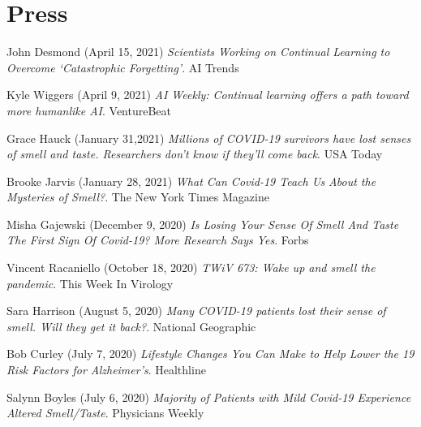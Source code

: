 \documentclass[10pt]{cooperCV2}
\begin{document}

\section{Press}

 
\begin{etaremune}[itemindent=-1.5\bibhang, topsep=0pt,
				   itemsep=\bibsep,partopsep=0pt,parsep=0pt,leftmargin={\bibhang+\widthof{[999]}}] 
    
    
    \item John Desmond (April 15, 2021) \textit{Scientists Working on Continual Learning to Overcome ‘Catastrophic Forgetting’}. AI Trends
     
	
    \item Kyle Wiggers (April 9, 2021) \textit{AI Weekly: Continual learning offers a path toward more humanlike AI}. VentureBeat
     
	
    \item Grace Hauck (January 31,2021) \textit{Millions of COVID-19 survivors have lost senses of smell and taste. Researchers don't know if they'll come back}. USA Today
     
	
    \item Brooke Jarvis (January 28, 2021) \textit{What Can Covid-19 Teach Us About the Mysteries of Smell?}. The New York Times Magazine
     
	
    \item Misha Gajewski (December 9, 2020) \textit{Is Losing Your Sense Of Smell And Taste The First Sign Of Covid-19? More Research Says Yes}. Forbs
     
	
    \item Vincent Racaniello (October 18, 2020) \textit{TWiV 673: Wake up and smell the pandemic}. This Week In Virology
     
	
    \item Sara Harrison (August 5, 2020) \textit{Many COVID-19 patients lost their sense of smell. Will they get it back?}. National Geographic
     
	
    \item Bob Curley (July 7, 2020) \textit{Lifestyle Changes You Can Make to Help Lower the 19 Risk Factors for Alzheimer’s}. Healthline
     
	
    \item Salynn Boyles (July 6, 2020) \textit{Majority of Patients with Mild Covid-19 Experience Altered Smell/Taste}. Physicians Weekly
     

\end{etaremune}
\end{document}
